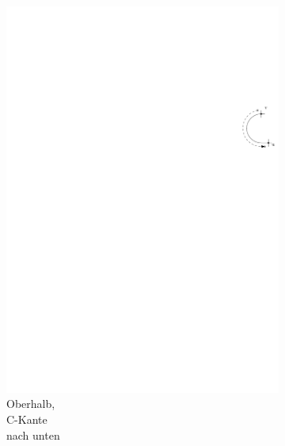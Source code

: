 \documentclass[a4paper]{scrreprt}
\theoremstyle{definition}
\begin{document}
\begin{figure}[h]
\begin{subfigure}[b]{0.2\textwidth}
                \includegraphics[width=\textwidth]{schnitt_finden_top_downwardsC}
                \caption{Oberhalb, \\ C-Kante \\ nach unten}
                \label{fig:cutfinding_top_downwardsC}
        \end{subfigure}
        \quad
        \begin{subfigure}[b]{0.2\textwidth}

\end{subfigure}
\end{figure}
\end{document}
